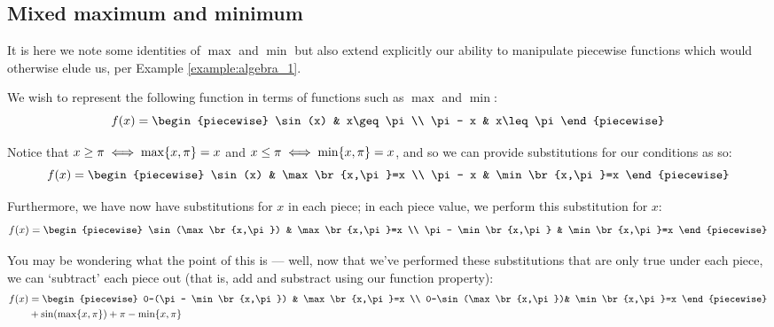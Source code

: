 \subsection{Mixed maximum and minimum}
It is here we note some identities of $\max$ and $\min$ but also extend explicitly our ability to manipulate piecewise functions which would otherwise elude us, per Example \ref{example:algebra_1}.

\begin{example}
    \label{example:gluing_basic}
    We wish to represent the following function in terms of functions such as $\max$ and $\min$:
    $$
        f(x) = \begin{piecewise}
            \sin(x) & x\geq\pi \\
            \pi - x & x\leq\pi
        \end{piecewise}
    $$

    Notice that $x\geq\pi\iff\max\{x,\pi\}=x$ and $x\leq\pi\iff\min\{x,\pi\}=x$, and so we can provide substitutions for our conditions as so:
    $$
        f(x) = \begin{piecewise}
            \sin(x) & \max\br{x,\pi}=x \\
            \pi - x & \min\br{x,\pi}=x
        \end{piecewise}
    $$

    Furthermore, we have now have substitutions for $x$ in each piece; in each piece value, we perform this substitution for $x$:
    $$
        f(x) = \begin{piecewise}
            \sin(\max\br{x,\pi}) & \max\br{x,\pi}=x \\
            \pi - \min\br{x,\pi} & \min\br{x,\pi}=x
        \end{piecewise}
    $$

    You may be wondering what the point of this is --- well, now that we've performed these substitutions that are only true under each piece, we can `subtract' each piece out (that is, add and substract using our function property):
    \begin{align*}
        f(x) &= \begin{piecewise}
            0-(\pi - \min\br{x,\pi}) & \max\br{x,\pi}=x \\
            0-\sin(\max\br{x,\pi})& \min\br{x,\pi}=x
        \end{piecewise} \\
        &+\sin(\max\br{x,\pi})+\pi - \min\br{x,\pi}
    \end{align*}


\end{example}

